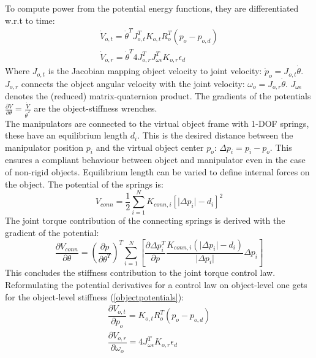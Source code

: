 \documentclass[conference]{IEEEtran}
\begin{document}
To compute power from the potential energy functions, they are differentiated w.r.t to time:
\begin{subequations}
\begin{align}
\dot{V}_{o,t} = \dot{\theta}^T J_{o,t}^T K_{o,t} R_o^T (p_o-p_{o,d})\\
\dot{V}_{o,r} = \dot{\theta}^T 4 J_{o,r}^T J_{\omega\epsilon}^T K_{o,r} \epsilon_d
\end{align}
\end{subequations}
Where $ J_{o,t} $ is the Jacobian mapping object velocity to joint velocity: $ \dot{p}_o = J_{o,t} \dot{\theta} $. $ J_{o,r} $ connects the object angular velocity with the joint velocity: $ \omega_o = J_{o,r} \dot{\theta} $. $ J_{\omega\epsilon} $ denotes the (reduced) matrix-quaternion product.
The gradients of the potentials $ \frac{\partial V}{\partial \theta} = \frac{\dot{V}}{\dot{\theta}^T} $ are the object-stiffness wrenches.\\
The manipulators are connected to the virtual object frame with 1-DOF springs, these have an equilibrium length $ d_i $. This is the desired distance between the manipulator position $ p_i $ and the virtual object center $ p_o $: $ \Delta p_i = p_i - p_o $. This ensures a compliant behaviour between object and manipulator even in the case of non-rigid objects. Equilibrium length can be varied to define internal forces on the object. The potential of the springs is:
\begin{equation}
V_{conn} = \dfrac{1}{2} \sum_{i=1}^N K_{conn,i} \left[ \vert\Delta p_i \vert - d_i \right]^2
\end{equation}
The joint torque contribution of the connecting springs is derived with the gradient of the potential:
\begin{equation}
\dfrac{\partial V_{conn}}{\partial \theta} = \left(\frac{\partial p}{\partial \theta^T}\right)^T \sum_{i=1}^N\left[\dfrac{\partial\Delta p_i^T}{\partial p}\dfrac{K_{conn,i}(\vert\Delta p_i\vert - d_i)}{\vert\Delta p_i\vert}\Delta p_i\right] 
\end{equation}
This concludes the stiffness contribution to the joint torque control law.\\
Reformulating the potential derivatives for a control law on object-level one gets for the object-level stiffness (\ref{objectpotentials}):
\begin{subequations}
\begin{align}
\dfrac{\partial V_{o,t}}{\partial p_o} = K_{o,t} R_o^T (p_o-p_{o,d}) \\
\dfrac{\partial V_{o,r}}{\partial \omega_o} = 4 J^T_{\omega\epsilon} K_{o,r} \epsilon_d 
\end{align}
\end{subequations}
\end{document}
